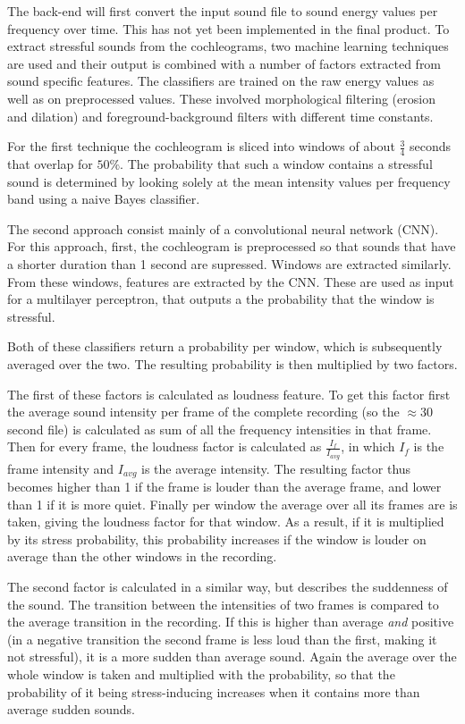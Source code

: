 The back-end will first convert the input sound file to sound energy values per frequency over time. This has not yet been implemented in the final product. To extract stressful sounds from the cochleograms, two machine learning techniques are used and their output is combined with a number of factors extracted from sound specific features.
The classifiers are trained on the raw energy values as well as on preprocessed values. These involved morphological filtering (erosion and dilation) and foreground-background filters with different time constants.

For the first technique the cochleogram is sliced into windows of about $\frac{3}{4}$ seconds that overlap for $50\%$. The probability that such a window contains a stressful sound is determined by looking solely at the mean intensity values per frequency band using a naive Bayes classifier.  

The second approach consist mainly of a convolutional neural network (CNN). For this approach, first, the cochleogram is preprocessed so that sounds that have a shorter duration than 1 second are supressed. Windows are extracted similarly. From these windows, features are extracted by the CNN. These are used as input for a multilayer perceptron, that outputs a the probability that the window is stressful. 

Both of these classifiers return a probability per window, which is subsequently averaged over the two. The resulting probability is then multiplied by two factors. 

The first of these factors is calculated as loudness feature. To get this factor first the average sound intensity per frame of the complete recording (so the $\approx$30 second file) is calculated as sum of all the frequency intensities in that frame. Then for every frame, the loudness factor is calculated as $\frac{I_f}{I_{avg}}$, in which $I_f$ is the frame intensity and $I_{avg}$ is the average intensity. The resulting factor thus becomes higher than 1 if the frame is louder than the average frame, and lower than 1 if it is more quiet. Finally per window the average over all its frames are is taken, giving the loudness factor for that window. As a result, if it is multiplied by its stress probability, this probability increases if the window is louder on average than the other windows in the recording.

The second factor is calculated in a similar way, but describes the suddenness of the sound. The transition between the intensities of two frames is compared to the average transition in the recording. If this is higher than average \textit{and} positive (in a negative transition the second frame is less loud than the first, making it not stressful), it is a more sudden than average sound. Again the average over the whole window is taken and multiplied with the probability, so that the probability of it being stress-inducing increases when it contains more than average sudden sounds.

